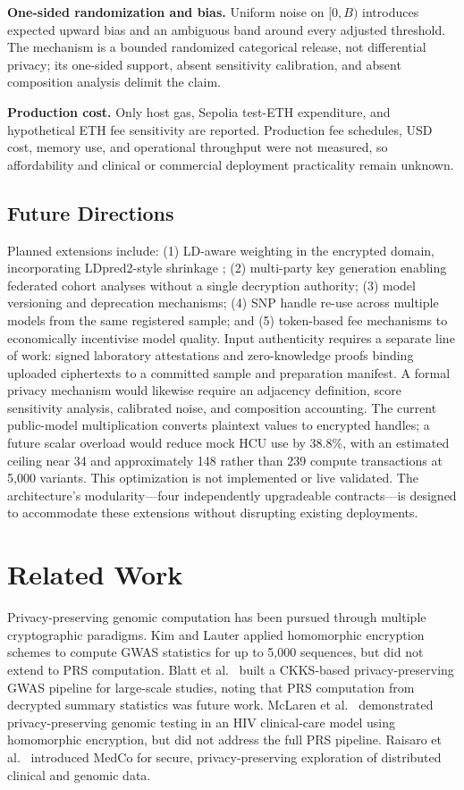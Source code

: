 \documentclass[10pt,twocolumn]{article}
\begin{document}
\textbf{One-sided randomization and bias.}
Uniform noise on $[0,B)$ introduces expected upward bias and an ambiguous band around
every adjusted threshold.  The mechanism is a bounded randomized categorical release,
not differential privacy; its one-sided support, absent sensitivity calibration, and
absent composition analysis delimit the claim.

\textbf{Production cost.}
Only host gas, Sepolia test-ETH expenditure, and hypothetical ETH fee sensitivity are
reported.  Production fee schedules, USD cost, memory use, and operational throughput
were not measured, so affordability and clinical or commercial deployment practicality
remain unknown.

\subsection{Future Directions}

Planned extensions include: (1) LD-aware weighting in the encrypted domain,
incorporating LDpred2-style shrinkage \citep{prive2020ldpred2}; (2) multi-party key
generation enabling federated cohort analyses without a single decryption authority;
(3) model versioning and deprecation mechanisms; (4) SNP handle re-use across
multiple models from the same registered sample; and (5) token-based fee mechanisms
to economically incentivise model quality.  Input authenticity requires a separate
line of work: signed laboratory attestations and zero-knowledge proofs binding uploaded
ciphertexts to a committed sample and preparation manifest.  A formal privacy mechanism
would likewise require an adjacency definition, score sensitivity analysis, calibrated
noise, and composition accounting.  The current public-model multiplication converts
plaintext values to encrypted handles; a future scalar overload would reduce mock HCU
use by 38.8\%, with an estimated ceiling near 34 and approximately 148 rather than 239
compute transactions at 5,000 variants.  This optimization is not implemented or live
validated.  The architecture's modularity---four
independently upgradeable contracts---is designed to accommodate these extensions
without disrupting existing deployments.

\section{Related Work}
\label{sec:related}

Privacy-preserving genomic computation has been pursued through multiple
cryptographic paradigms.  Kim and Lauter \citep{kim2015} applied homomorphic
encryption schemes to compute GWAS statistics for up to 5,000 sequences, but did not
extend to PRS computation.  Blatt et al.\ \citep{blatt2020} built a CKKS-based
privacy-preserving GWAS pipeline for large-scale studies, noting that PRS
computation from decrypted summary statistics was future work.  McLaren et al.\
\citep{mclaren2016} demonstrated privacy-preserving genomic testing in an HIV
clinical-care model using homomorphic encryption, but did not address the full PRS
pipeline.  Raisaro et al.\ \citep{raisaro2019} introduced MedCo for secure,
privacy-preserving exploration of distributed clinical and genomic data.
\end{document}
